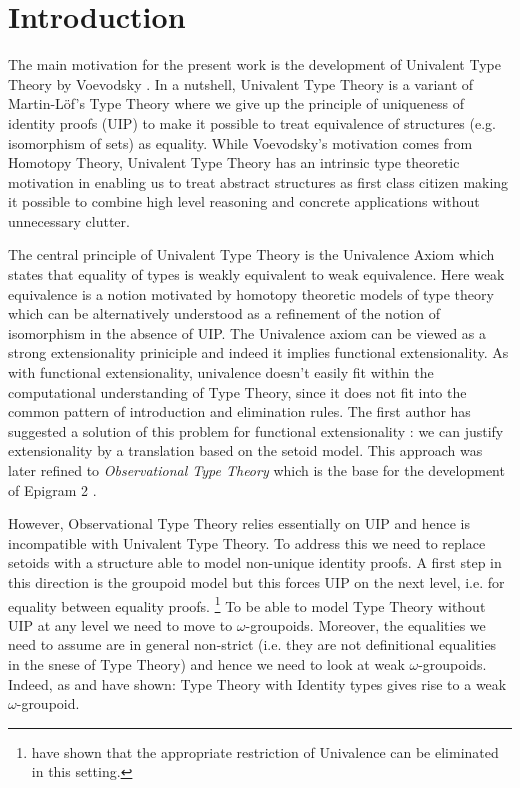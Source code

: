 \section{Introduction}

The main motivation for the present work is the development of
Univalent Type Theory by Voevodsky \cite{voevodsky}. In a
nutshell, Univalent Type Theory is a variant of Martin-L\"of's Type
Theory where we give up the principle of uniqueness of identity proofs
(UIP) to make it possible to treat equivalence of structures
(e.g. isomorphism of sets) as equality. While Voevodsky's motivation
comes from Homotopy Theory, Univalent Type Theory has an intrinsic
type theoretic motivation in enabling us to treat abstract structures
as first class citizen making it possible to combine high level
reasoning and concrete applications without unnecessary clutter. 

The central principle of Univalent Type Theory is the Univalence Axiom
which states that equality of types is weakly equivalent to weak
equivalence. Here weak equivalence is a notion motivated by homotopy
theoretic models of type theory which can be alternatively understood
as a refinement of the notion of isomorphism in the absence of
UIP. The Univalence axiom can be viewed as a strong extensionality
priniciple and indeed it implies functional extensionality. As with
functional extensionality, univalence doesn't easily fit within the
computational understanding of Type Theory, since it does not fit into
the common pattern of introduction and elimination rules. The first
author has suggested a solution of this problem for functional
extensionality \cite{altenkirch99:extensional-equality}: we can justify extensionality by a
translation based on the setoid model. This approach was later refined
\cite{altenkirch07:observational-equality} to \emph{Observational Type Theory} which is the base
for the development of Epigram 2 \cite{epigram2}.

However, Observational Type Theory relies essentially on UIP and hence
is incompatible with Univalent Type Theory. To address this we need to
replace setoids with a structure able to model non-unique identity
proofs. A first step in this direction is the groupoid model
\cite{hofmann98:the-groupoid-interpretation} but this forces UIP on the next level, i.e. for
equality between equality proofs. 
\footnote{\cite{licata:2011} have shown that the appropriate
  restriction of Univalence can be eliminated in this setting.}
To be able to model Type Theory
without UIP at any level we need to move to
$\omega$-groupoids. Moreover, the equalities we need to assume are in
general non-strict (i.e. they are not definitional equalities in the
snese of Type Theory) and hence we need to look at weak
$\omega$-groupoids. Indeed, as \cite{berg08:types-are} and \cite{lumsdaine10:weak-o-categories} have
shown: Type Theory with Identity types gives rise to a weak
$\omega$-groupoid. 


